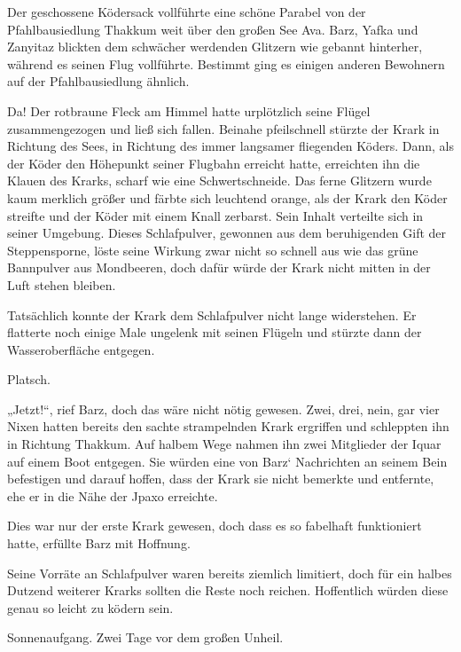 Der geschossene Ködersack vollführte eine schöne Parabel von der Pfahlbausiedlung Thakkum weit über den großen See Ava. Barz, Yafka und Zanyitaz blickten dem schwächer werdenden Glitzern wie gebannt hinterher, während es seinen Flug vollführte. Bestimmt ging es einigen anderen Bewohnern auf der Pfahlbausiedlung ähnlich.

Da! Der rotbraune Fleck am Himmel hatte urplötzlich seine Flügel zusammengezogen und ließ sich fallen. Beinahe pfeilschnell stürzte der Krark in Richtung des Sees, in Richtung des immer langsamer fliegenden Köders. Dann, als der Köder den Höhepunkt seiner Flugbahn erreicht hatte, erreichten ihn die Klauen des Krarks, scharf wie eine Schwertschneide. Das ferne Glitzern wurde kaum merklich größer und färbte sich leuchtend orange, als der Krark den Köder streifte und der Köder mit einem Knall zerbarst. Sein Inhalt verteilte sich in seiner Umgebung. Dieses Schlafpulver, gewonnen aus dem beruhigenden Gift der Steppensporne, löste seine Wirkung zwar nicht so schnell aus wie das grüne Bannpulver aus Mondbeeren, doch dafür würde der Krark nicht mitten in der Luft stehen bleiben.

Tatsächlich konnte der Krark dem Schlafpulver nicht lange widerstehen. Er flatterte noch einige Male ungelenk mit seinen Flügeln und stürzte dann der Wasseroberfläche entgegen.

Platsch.

„Jetzt!“, rief Barz, doch das wäre nicht nötig gewesen. Zwei, drei, nein, gar vier Nixen hatten bereits den sachte strampelnden Krark ergriffen und schleppten ihn in Richtung Thakkum. Auf halbem Wege nahmen ihn zwei Mitglieder der Iquar auf einem Boot entgegen. Sie würden eine von Barz‘ Nachrichten an seinem Bein befestigen und darauf hoffen, dass der Krark sie nicht bemerkte und entfernte, ehe er in die Nähe der Jpaxo erreichte.

Dies war nur der erste Krark gewesen, doch dass es so fabelhaft funktioniert hatte, erfüllte Barz mit Hoffnung.

Seine Vorräte an Schlafpulver waren bereits ziemlich limitiert, doch für ein halbes Dutzend weiterer Krarks sollten die Reste noch reichen. Hoffentlich würden diese genau so leicht zu ködern sein.



\trennzeichen



Sonnenaufgang. Zwei Tage vor dem großen Unheil.\bigskip



